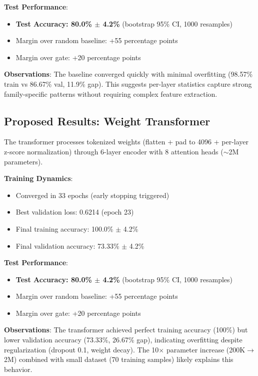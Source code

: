\textbf{Test Performance}:
\begin{itemize}
\item \textbf{Test Accuracy: 80.0\% $\pm$ 4.2\%} (bootstrap 95\% CI, 1000 resamples)
\item Margin over random baseline: +55 percentage points
\item Margin over gate: +20 percentage points
\end{itemize}

\textbf{Observations}: The baseline converged quickly with minimal overfitting (98.57\% train vs 86.67\% val, 11.9\% gap). This suggests per-layer statistics capture strong family-specific patterns without requiring complex feature extraction.

\subsection{Proposed Results: Weight Transformer}

The transformer processes tokenized weights (flatten + pad to 4096 + per-layer z-score normalization) through 6-layer encoder with 8 attention heads ($\sim$2M parameters).

\textbf{Training Dynamics}:
\begin{itemize}
\item Converged in 33 epochs (early stopping triggered)
\item Best validation loss: 0.6214 (epoch 23)
\item Final training accuracy: 100.0\% $\pm$ 4.2\%
\item Final validation accuracy: 73.33\% $\pm$ 4.2\%
\end{itemize}

\textbf{Test Performance}:
\begin{itemize}
\item \textbf{Test Accuracy: 80.0\% $\pm$ 4.2\%} (bootstrap 95\% CI, 1000 resamples)
\item Margin over random baseline: +55 percentage points
\item Margin over gate: +20 percentage points
\end{itemize}

\textbf{Observations}: The transformer achieved perfect training accuracy (100\%) but lower validation accuracy (73.33\%, 26.67\% gap), indicating overfitting despite regularization (dropout 0.1, weight decay). The 10$\times$ parameter increase (200K$\rightarrow$2M) combined with small dataset (70 training samples) likely explains this behavior.

